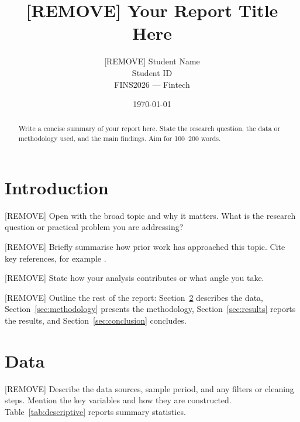 \documentclass[12pt]{article}
\title{[REMOVE] Your Report Title Here}
\author{[REMOVE] Student Name \\ [REMOVE] Student ID \\ FINS2026 --- Fintech}
\date{\today}
\begin{document}
\maketitle

\begin{abstract}
\noindent
[REMOVE] Write a concise summary of your report here. State the research
question, the data or methodology used, and the main findings. Aim for
100--200 words.
\end{abstract}

\thispagestyle{empty}
\pagebreak
\setcounter{page}{1}
\onehalfspacing




\section{Introduction}\label{sec:intro}

[REMOVE] Open with the broad topic and why it matters. What is the
research question or practical problem you are addressing?

[REMOVE] Briefly summarise how prior work has approached this topic.
Cite key references, for example \citet{FamaFrench_1993}.

[REMOVE] State how your analysis contributes or what angle you take.

[REMOVE] Outline the rest of the report: Section~\ref{sec:data}
describes the data, Section~\ref{sec:methodology} presents the
methodology, Section~\ref{sec:results} reports the results, and
Section~\ref{sec:conclusion} concludes.




\section{Data}\label{sec:data}

[REMOVE] Describe the data sources, sample period, and any filters or
cleaning steps. Mention the key variables and how they are constructed.
Table~\ref{tab:descriptive} reports summary statistics.
\end{document}

